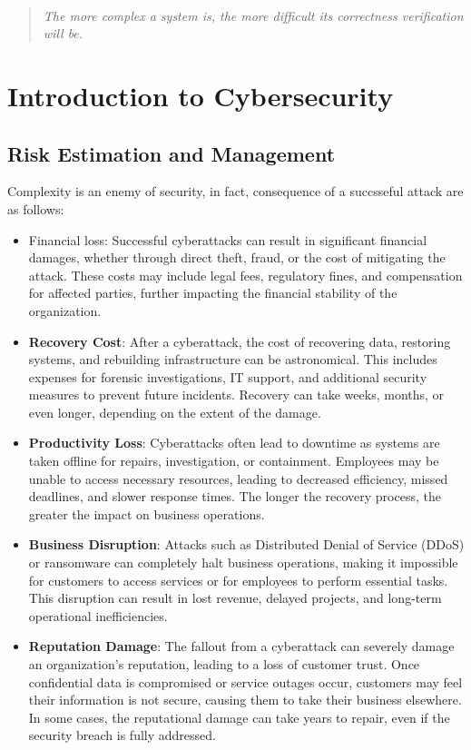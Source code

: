 \

\vfill

\begin{center}
    \begin{quotation}
    \raggedleft
    \textit{The more complex a system is, the more \newline difficult its correctness verification will be.}
    \end{quotation}
\end{center}
\vfill

\chapter{Introduction to Cybersecurity}


\section{Risk Estimation and Management}
\cite{01_introduction}
Complexity is an enemy of security, in fact, consequence of a succsseful attack are as follows:
\begin{itemize}
    \item Financial loss: Successful cyberattacks can result in significant financial damages, whether through direct theft, fraud, or the cost of mitigating the attack. These costs may include legal fees, regulatory fines, and compensation for affected parties, further impacting the financial stability of the organization.
    \item \textbf{Recovery Cost}: After a cyberattack, the cost of recovering data, restoring systems, and rebuilding infrastructure can be astronomical. This includes expenses for forensic investigations, IT support, and additional security measures to prevent future incidents. Recovery can take weeks, months, or even longer, depending on the extent of the damage.

\item \textbf{Productivity Loss}: Cyberattacks often lead to downtime as systems are taken offline for repairs, investigation, or containment. Employees may be unable to access necessary resources, leading to decreased efficiency, missed deadlines, and slower response times. The longer the recovery process, the greater the impact on business operations.

\item \textbf{Business Disruption}: Attacks such as Distributed Denial of Service (DDoS) or ransomware can completely halt business operations, making it impossible for customers to access services or for employees to perform essential tasks. This disruption can result in lost revenue, delayed projects, and long-term operational inefficiencies.

\item \textbf{Reputation Damage}: The fallout from a cyberattack can severely damage an organization's reputation, leading to a loss of customer trust. Once confidential data is compromised or service outages occur, customers may feel their information is not secure, causing them to take their business elsewhere. In some cases, the reputational damage can take years to repair, even if the security breach is fully addressed.
\end{itemize}


